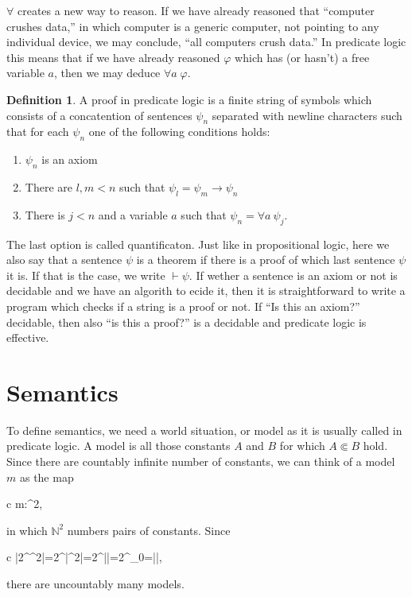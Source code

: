 \documentclass[11pt,oneside,%
]{memoir}
\newenvironment{eqna}{\begin{IEEEeqnarray}{c}}{\end{IEEEeqnarray}\ignorespacesafterend}
\theoremstyle{definition}
\newtheorem{maaritelma}{Definition}
\newcommand{\NN}{\mathbb{N}}
\newcommand{\RR}{\mathbb{R}}
\begin{document}

\(\forall\) creates a new way to reason. If we have already reasoned that ``computer crushes data,'' in which computer is a generic computer, not pointing to any individual device, we may conclude, ``all computers crush data.'' In predicate logic this means that if we have already reasoned \(\varphi\) which has (or hasn't) a free variable \(a\), then we may deduce \(\forall a\;\varphi\).

\begin{maaritelma}
A proof in predicate logic is a finite string of symbols which consists of a concatention of sentences \(\psi_n\) separated with newline characters such that for each \(\psi_n\) one of the following conditions holds:
\begin{enumerate}
    \item \(\psi_n\) is an axiom
    \item There are \(l,m<n\) such that \(\psi_l=\psi_m\rightarrow\psi_n\)
    \item There is \(j<n\) and a variable \(a\) such that \(\psi_n=\forall a\:\psi_j\).
\end{enumerate}
\end{maaritelma}
The last option is called quantificaton. Just like in propositional logic, here we also say that a sentence \(\psi\) is a theorem if there is a proof of which last sentence \(\psi\) it is. If that is the case, we write \(\vdash\psi\). If wether a sentence is an axiom or not is decidable and we have an algorith to ecide it, then it is straightforward to write a program which checks if a string is a proof or not. If ``Is this an axiom?'' decidable, then also ``is this a proof?'' is a decidable and predicate logic is effective.

\section{Semantics}

To define semantics, we need a world situation, or model as it is usually called in predicate logic. A model is all those constants \(A\) and \(B\) for which \(A\Subset B\) hold. Since there are countably infinite number of constants, we can think of a model \(m\) as the map
\begin{eqna}
    m:\NN^2\rightarrow\lbrace{},\rbrace
\end{eqna}
in which \(\NN^2\) numbers pairs of constants. Since
\begin{eqna}
    |2^{\NN^2}|=2^{|\NN^2|}=2^{|\NN|}=2^{\aleph_0}=|\RR|,
\end{eqna}
there are uncountably many models.
\end{document}
